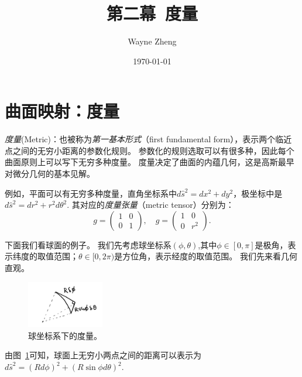 \documentclass{article}
\title{第二幕~度量}
\author{Wayne Zheng}
\date{\today}
\begin{document}
\maketitle
\tableofcontents

\section{曲面映射：度量}

\emph{度量}(Metric)：也被称为\emph{第一基本形式}（first fundamental form），表示两个临近点之间的无穷小距离的参数化规则。
参数化的规则选取可以有很多种，因此每个曲面原则上可以写下无穷多种度量。
度量决定了曲面的内蕴几何，这是高斯最早对微分几何的基本见解。

例如，平面可以有无穷多种度量，直角坐标系中$d\hat{s}^{2}=dx^{2}+dy^{2}$，极坐标中是$d\hat{s}^{2}=dr^{2}+r^{2}d\theta^{2}$.
其对应的\emph{度量张量}（metric tensor）分别为：
\begin{equation}
g=
\begin{pmatrix}
1 & 0 \\
0 & 1
\end{pmatrix}, \quad
g=
\begin{pmatrix}
1 & 0 \\
0 & r^{2}
\end{pmatrix}.
\end{equation}

下面我们看球面的例子。
我们先考虑球坐标系$(\phi, \theta)$,其中$\phi\in[0, \pi]$是极角，表示纬度的取值范围；$\theta\in[0, 2\pi)$是方位角，表示经度的取值范围。
我们先来看几何直观。

\begin{figure}[htbp]
    \centering %
    \includegraphics[width=0.3\textwidth]{../figs/chap4_01.jpg} %
    \caption{球坐标系下的度量。} 
    \label{fig:chap4_01} 
\end{figure}

由图~\ref{fig:chap4_01}可知，球面上无穷小两点之间的距离可以表示为$d\hat{s}^{2}=\left(Rd\phi\right)^{2}+\left(R\sin\phi{d}\theta\right)^{2}$.
\end{document}
